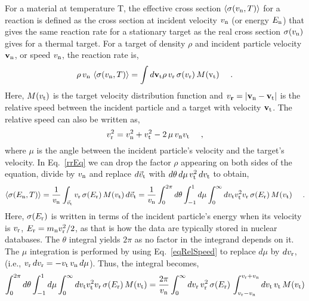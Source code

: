 \documentclass[11pt,twoside]{article}
\begin{document}
For a material at temperature T, the effective cross section ${\left<\sigma(v_{\rm n},T)\right>}$ for a reaction is defined 
as the cross section at incident velocity $v_{\rm n}$ (or energy $E_{\rm n}$) that gives the same reaction rate for a stationary target as the real 
cross section $\sigma(v_{\rm n})$ gives for a thermal target. For a target
of density $\rho$ and incident particle velocity ${\bf v}_{\rm n}$, or speed $v_{\rm n}$, the reaction rate is, 
\begin{equation}	\label{rrEq}
	\rho \, v_{\rm n} \, \left<\sigma(v_{\rm n},T)\right> = \int d{\bf v}_{\rm t} \rho \, v_{\rm r} \, 
		\sigma( v_{\rm r}) \, M({\rm v}_{\rm t}) \ \ \ \ .
\end{equation}
Here, $M(v_{\rm t})$ is the target velocity distribution function and $v_{\bf r} = |{\bf v}_{\rm n} - {\bf v}_{\rm t}|$ 
is the relative speed between the incident particle and a target with velocity ${\bf v}_{\rm t}$.
The relative speed can also be written as,
\begin{equation}    \label{eqRelSpeed}
    v_{\rm r}^2 = v_{\rm n}^2 + v_{\rm t}^2 - 2 \, \mu \, v_{\rm n} v_{\rm t} \ \ \ \ ,
\end{equation}
where $\mu$ is the angle between the incident particle's velocity and the target's velocity.
In Eq.~\ref{rrEq} we can drop the factor $\rho$ appearing on both sides of the equation,
divide by $v_{\rm n}$
and replace $d\vec{v}_{\rm t}$ with $d\theta \, d\mu \, v_{\rm t}^2 \, dv_{\rm t}$ to obtain,
\begin{equation} \label{eqSigmaAverage}
    \left<\sigma(E_{\rm n},T)\right>
    = {1 \over v_{\rm n}} \int_{\vec{v}_{\rm t}} v_{\rm r} \, \sigma(E_{\rm r}) \, M(v_{\rm t}) \, d\vec{v}_{\rm t}
    = {1 \over v_{\rm n}} \int_0^{2 \pi} d\theta \int_{-1}^1 d\mu \int_0^\infty dv_{\rm t} v_{\rm t}^2 v_{\rm r}
        \, \sigma(E_{\rm r}) \, M(v_{\rm t}) \ \ \ \ .
\end{equation}
Here, $\sigma(E_{\rm r})$ is written in terms of the incident particle's energy when its velocity is $v_{\rm r}$, 
$E_{\rm r} = m_{\rm n} v_{\rm r}^2 / 2$, as that is how the data are typically stored in nuclear databases.
The $\theta$ integral yields $2 \pi$ as no factor in the integrand depends on it.  The $\mu$ integration
is performed by using Eq.~\ref{eqRelSpeed} to replace $d\mu$ by $dv_{\rm r}$,
(i.e., $v_{\rm r} \, dv_{\rm r} = -v_{\rm t} \, v_{\rm n} \, d\mu$). Thus, the integral becomes,
\begin{equation}
    \int_0^{2 \pi} d\theta \int_{-1}^1 d\mu \int_0^\infty dv_{\rm t} v_{\rm t}^2 v_{\rm r} \, \sigma(E_{\rm r}) \, M(v_{\rm t})
    = { 2 \pi \over v_{\rm n} } \int_0^\infty dv_{\rm r} \, v_{\rm r}^2 \, \sigma(E_{\rm r}) \,
        \int_{v_{\rm r} - v_{\rm n}}^{v_{\rm r} + v_{\rm n}} dv_{\rm t} \, v_{\rm t} \, M(v_{\rm t})
\end{equation}
\end{document}

